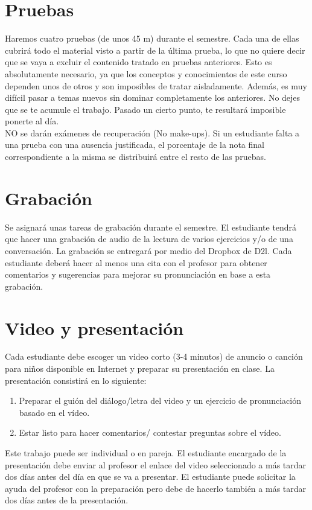 \documentclass[12pt]{article}
\begin{document}
\section{Pruebas}
\begin{singlespace}
\noindent Haremos cuatro pruebas (de unos 45 m) durante el semestre. Cada una de ellas cubrirá todo el material visto a partir de la última prueba, lo que no quiere decir que se vaya a excluir el contenido tratado en pruebas anteriores. Esto es absolutamente necesario, ya que los conceptos y conocimientos de este curso dependen unos de otros y son imposibles de tratar aisladamente. Además, es muy difícil pasar a temas nuevos sin dominar completamente los anteriores. No dejes que se te acumule el trabajo. Pasado un cierto punto, te resultará imposible ponerte al día. \\

\noindent NO se darán exámenes de recuperación (No make-ups). Si un estudiante falta a una prueba con una ausencia justificada, el porcentaje de la nota final correspondiente a la misma se distribuirá entre el resto de las pruebas.
\end{singlespace}

\section{Grabación}
\begin{singlespace}
\noindent Se asignará unas tareas de grabación durante el semestre. El estudiante tendrá que hacer una grabación de audio de la lectura de varios ejercicios y/o de una conversación. La grabación se entregará por medio del Dropbox de D2l. Cada estudiante deberá hacer al menos una cita con el profesor para obtener comentarios y sugerencias para mejorar su pronunciación en base a esta grabación.
\end{singlespace}

\section{Video y presentación}
\begin{singlespace}
\noindent Cada estudiante debe escoger un video corto (3-4 minutos) de anuncio o canción para niños disponible en Internet y preparar su presentación en clase. La presentación consistirá en lo siguiente: 
\begin{enumerate}
	\item Preparar el guión del diálogo/letra del video y un ejercicio de pronunciación basado en el vídeo.
	\item Estar listo para hacer comentarios/ contestar preguntas sobre el vídeo.
\end{enumerate}

Este trabajo puede ser individual o en pareja. El estudiante encargado de la presentación debe enviar al profesor el enlace del video seleccionado a más tardar dos días antes del día en que se va a presentar. El estudiante puede solicitar la ayuda del profesor con la preparación pero debe de hacerlo también a más tardar dos días antes de la presentación.
\end{singlespace}
\end{document}
